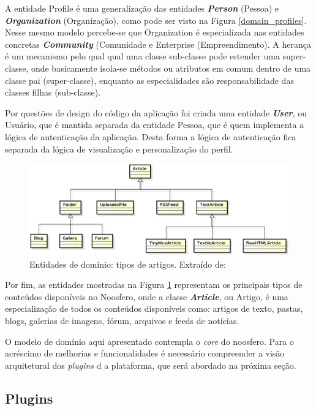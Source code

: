 A entidade Profile é uma generalização das entidades \textbf{\textit{Person}} (Pessoa) e \textbf{\textit{Organization}} (Organização), como pode ser visto na Figura \ref{domain_profiles}. Nesse mesmo modelo percebe-se que Organization é especializada nas entidades concretas \textbf{\textit{Community}} (Comunidade e Enterprise (Empreendimento). A herança é um mecanismo pelo qual qual uma classe sub-classe pode estender uma super-classe, onde basicamente isola-se métodos ou atributos em comum dentro de uma classe pai (super-classe), enquanto as especialidades são responsabilidade das classes filhas (sub-classe).

Por questões de design do código da aplicação foi criada uma entidade \textbf{\textit{User}}, ou Usuário, que é mantida separada da entidade Pessoa, que é quem implementa a lógica de autenticação da aplicação. Desta forma a lógica de autenticação fica separada da lógica de visualização e personalização do perfil.

\begin{figure}[h]
    \centering
    \includegraphics[keepaspectratio=true,scale=0.55]
      {figuras/domain_articles.eps}
    \caption{Entidades de domínio: tipos de artigos. Extraído de: \cite{bucher2013rede}}
    \label{domain_articles}
\end{figure}

Por fim, as entidades mostradas na Figura \ref{domain_articles} representam os principais tipos de conteúdos disponíveis no Noosfero, onde a classe \textbf{\textit{Article}}, ou Artigo, é uma especialização de todos os conteúdos disponíveis como: artigos de texto, pastas, blogs, galerias de imagens, fórum, arquivos e feeds de notícias.

O modelo de domínio aqui apresentado contempla o \textit{core} do noosfero. Para o acréscimo de melhorias e funcionalidades é necessário compreender a visão arquitetural dos \textit{plugins} d a plataforma, que será abordado na próxima seção.

\subsection{Plugins}
\label{plugins-noosfero}

